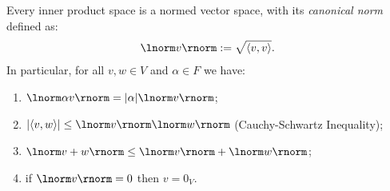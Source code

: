     \begin{proposition}
        Every inner product space is a normed vector space, with its \textit{canonical norm} defined as:
            \begin{equation*}
            \begin{split}
                \lnorm v \rnorm := \sqrt{\langle v,v \rangle}.
            \end{split}
            \end{equation*}
        In particular, for all $v,w \in V$ and $\alpha \in F$ we have:
            \begin{enumerate}[label = (\arabic*)]
                \item $\lnorm \alpha v \rnorm = |\alpha|\lnorm v \rnorm$;
                \item $|\langle v,w \rangle| \leq \lnorm v \rnorm \lnorm w \rnorm$ (Cauchy-Schwartz Inequality);
                \item $\lnorm v + w \rnorm \leq \lnorm v \rnorm + \lnorm w \rnorm$;
                \item if $\lnorm v \rnorm = 0$ then $v = 0_V$.
            \end{enumerate}
    \end{proposition}
